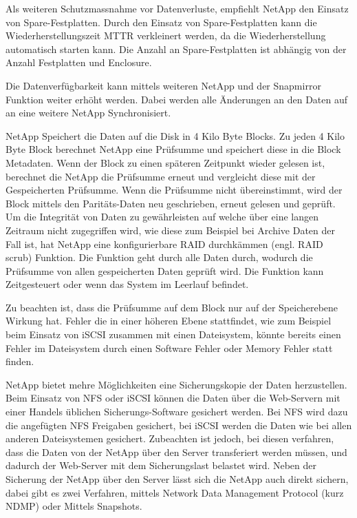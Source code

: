 Als weiteren Schutzmassnahme vor Datenverluste, empfiehlt NetApp den Einsatz von Spare-Festplatten. Durch den Einsatz von Spare-Festplatten kann die Wiederherstellungszeit MTTR verkleinert werden, da die Wiederherstellung automatisch starten kann. Die Anzahl an Spare-Festplatten ist abhängig von der Anzahl Festplatten und Enclosure.

Die Datenverfügbarkeit kann mittels weiteren NetApp und der Snapmirror Funktion weiter erhöht werden. Dabei werden alle Änderungen an den Daten auf an eine weitere NetApp Synchronisiert. 

NetApp Speichert die Daten auf die Disk in 4 Kilo Byte Blocks. Zu jeden 4 Kilo Byte Block berechnet NetApp eine Prüfsumme und speichert diese in die Block Metadaten. Wenn der Block zu einen späteren Zeitpunkt wieder gelesen ist, berechnet die NetApp die Prüfsumme erneut und vergleicht diese mit der Gespeicherten Prüfsumme. Wenn die Prüfsumme nicht übereinstimmt, wird der Block mittels den Paritäts-Daten neu geschrieben, erneut gelesen und geprüft. Um die Integrität von Daten zu gewährleisten auf welche über eine langen Zeitraum nicht zugegriffen wird, wie diese zum Beispiel bei Archive Daten der Fall ist, hat NetApp eine konfigurierbare RAID durchkämmen (engl. RAID scrub) Funktion. Die Funktion geht durch alle Daten durch, wodurch die Prüfsumme von allen gespeicherten Daten geprüft wird. Die Funktion kann Zeitgesteuert oder wenn das System im Leerlauf befindet. \cite{Sundaram2006}

Zu beachten ist, dass die Prüfsumme auf dem Block nur auf der Speicherebene Wirkung hat. Fehler die in einer höheren Ebene stattfindet, wie zum Beispiel beim Einsatz von iSCSI zusammen mit einen Dateisystem, könnte bereits einen Fehler im Dateisystem durch einen Software Fehler oder Memory Fehler statt finden. 

NetApp bietet mehre Möglichkeiten eine Sicherungskopie der Daten herzustellen. Beim Einsatz von NFS oder iSCSI können die Daten über die Web-Servern mit einer Handels üblichen Sicherungs-Software gesichert werden. Bei NFS wird dazu die angefügten NFS Freigaben gesichert, bei iSCSI werden die Daten wie bei allen anderen Dateisystemen gesichert. Zubeachten ist jedoch, bei diesen verfahren, dass die Daten von der NetApp über den Server transferiert werden müssen, und dadurch der Web-Server mit dem Sicherungslast belastet wird. Neben der Sicherung der NetApp über den Server lässt sich die NetApp auch direkt sichern, dabei gibt es zwei Verfahren, mittels  Network Data Management Protocol (kurz NDMP) oder Mittels Snapshots. 

